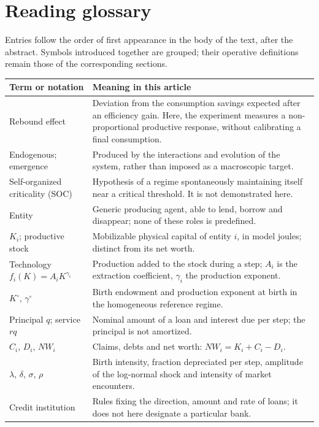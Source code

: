 \section{Reading glossary}\label{sec:glossaire}
Entries follow the order of first appearance in the body of the
text, after the abstract. Symbols introduced together are grouped;
their operative definitions remain those of the corresponding sections.

\begin{small}
\begin{longtable}{@{}>{\raggedright\arraybackslash}p{.27\linewidth}p{.66\linewidth}@{}}
\toprule Term or notation & Meaning in this article \\
\midrule\endhead
Rebound effect & Deviation from the consumption savings expected after an
efficiency gain. Here, the experiment measures a non-proportional
productive response, without calibrating a final consumption. \\
Endogenous; emergence & Produced by the interactions and evolution of
the system, rather than imposed as a macroscopic target. \\
Self-organized criticality (SOC) & Hypothesis of a regime spontaneously
maintaining itself near a critical threshold. It is not demonstrated
here. \\
Entity & Generic producing agent, able to lend, borrow and disappear;
none of these roles is predefined. \\
$K_i$; productive stock & Mobilizable physical capital of entity $i$,
in model joules; distinct from its net worth. \\
Technology $f_i(K)=A_iK^{\gamma_i}$ & Production added to the stock
during a step; $A_i$ is the extraction coefficient, $\gamma_i$ the
production exponent. \\
$K^\circ$, $\gamma^\circ$ & Birth endowment and production exponent
at birth in the homogeneous reference regime. \\
Principal $q$; service $rq$ & Nominal amount of a loan and interest
due per step; the principal is not amortized. \\
$C_i$, $D_i$, $NW_i$ & Claims, debts and net worth:
$NW_i=K_i+C_i-D_i$. \\
$\lambda$, $\delta$, $\sigma$, $\rho$ & Birth intensity, fraction
depreciated per step, amplitude of the log-normal shock and intensity
of market encounters. \\
Credit institution & Rules fixing the direction, amount and rate of
loans; it does not here designate a particular bank. \\

\end{longtable}
\end{small}
